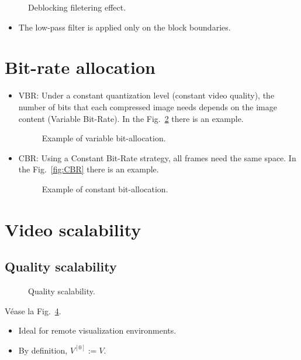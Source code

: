 \begin{figure}
  \caption{Deblocking filetering effect.}
  \label{fig:350px-Deblock1}
\end{figure}

\begin{itemize}
\tightlist
\item
  The low-pass filter is applied only on the block boundaries.
\end{itemize}

\section{Bit-rate allocation}
\begin{itemize}
\item
  VBR: Under a constant quantization level (constant video quality),
  the number of bits that each compressed image needs depends on the
  image content (Variable Bit-Rate). In the
  Fig.~\ref{fig:closed-loop-1_ir} there is an
  example.
  \begin{figure}
    \caption{Example of variable bit-allocation.}
    \label{fig:closed-loop-1_ir}
  \end{figure}
  
\item
  CBR: Using a Constant Bit-Rate strategy, all frames need the same
  space. In the
  Fig.~\ref{fig:CBR} there is an
  example.
  \begin{figure}
    \caption{Example of constant bit-allocation.}
    \label{CBR}
  \end{figure}
\end{itemize}

\section{Video scalability}
\subsection{Quality scalability}

\begin{figure}
  \caption{Quality scalability.}
  \label{fig:quality-scalability}
\end{figure}

Véase la Fig.~\ref{fig:quality-scalability}.
\begin{itemize}
\item
  Ideal for remote visualization environments.
\item
  By definition, $V^{[0]}:=V$.
\end{itemize}

